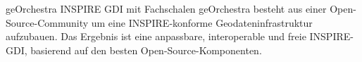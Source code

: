 %
{geOrchestra}%
{INSPIRE GDI mit Fachschalen}%
{
geOrchestra besteht aus einer Open-Source-Community um eine INSPIRE-konforme Geodateninfrastruktur
aufzubauen. Das Ergebnis ist eine anpassbare, interoperable und freie INSPIRE-GDI, basierend auf den
besten Open-Source-Komponenten.%
}

\label{bof-mittwoch}

